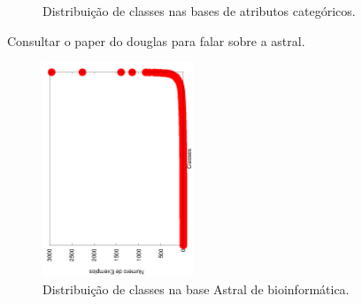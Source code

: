 \begin{figure}[h]

\caption{Distribuição de classes nas bases de atributos categóricos.}
\label{fig::basescategorias}
\end{figure}

Consultar o paper do douglas para falar sobre a astral.

\begin{figure}[h]
  \centering
  \includegraphics[angle=270, width=0.40\textwidth]{figures/perfil/astral.png}
 \caption{Distribuição de classes na base Astral de bioinformática.}
\label{fig::basesbio}
\end{figure}


